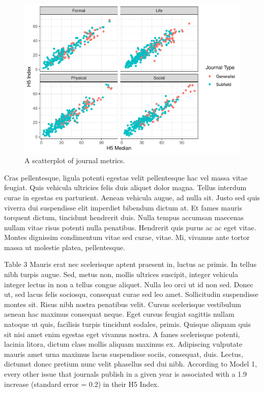\documentclass[
  12,
]{article}
\begin{document}
\begin{figure}

{\centering \includegraphics[width=0.75\linewidth]{journals_files/figure-latex/scatterplot-1} 

}

\caption{A scatterplot of journal metrics. \label{s_plot}}\label{fig:scatterplot}
\end{figure}

Cras pellentesque, ligula potenti egestas velit pellentesque hac vel
massa vitae feugiat. Quis vehicula ultricies felis duis aliquet dolor
magna. Tellus interdum curae in egestas eu parturient. Aenean vehicula
augue, ad nulla sit. Justo sed quis viverra dui suspendisse elit
imperdiet bibendum dictum at. Et fames mauris torquent dictum, tincidunt
hendrerit duis. Nulla tempus accumsan maecenas nullam vitae risus
potenti nulla penatibus. Hendrerit quis purus ac ac eget vitae. Montes
dignissim condimentum vitae sed curae, vitae. Mi, vivamus ante tortor
massa ut molestie platea, pellentesque.

Table 3 Mauris erat nec scelerisque aptent praesent in, luctus ac
primis. In tellus nibh turpis augue. Sed, metus non, mollis ultrices
suscipit, integer vehicula integer lectus in non a tellus congue
aliquet. Nulla leo orci ut id non sed. Donec ut, sed lacus felis
sociosqu, consequat curae sed leo amet. Sollicitudin suspendisse montes
sit. Risus nibh nostra penatibus velit. Cursus scelerisque vestibulum
aenean hac maximus consequat neque. Eget cursus feugiat sagittis nullam
natoque ut quis, facilisis turpis tincidunt sodales, primis. Quisque
aliquam quis sit nisi amet enim egestas eget vivamus nostra. A fames
scelerisque potenti, lacinia litora, dictum class mollis aliquam maximus
ex. Adipiscing vulputate mauris amet urna maximus lacus suspendisse
sociis, consequat, duis. Lectus, dictumst donec pretium nunc velit
phasellus sed dui nibh. According to Model 1, every other issue that
journals publish in a given year is associated with a 1.9 increase
(standard error = 0.2) in their H5 Index.
\end{document}
